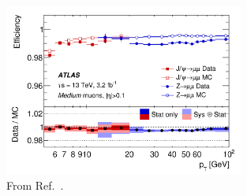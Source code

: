 \begin{figure}[!htb]
    \begin{center}
        \includegraphics[width=0.7\textwidth]{figures/chapter3/muon/muon_reco_eff_medium}
        \caption{
            From Ref.~\cite{Aad:2016jkr}.
        }
        \label{fig:muon_reco_eff}
    \end{center}
\end{figure}

\FloatBarrier

